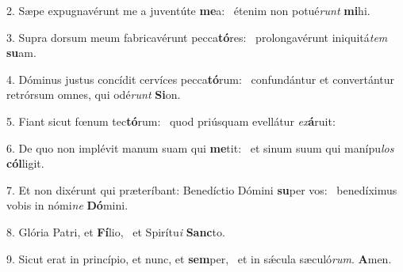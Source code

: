 2. Sæpe expugnavérunt me a juventúte \textbf{me}a: \ast\  étenim non potué\textit{runt} \textbf{mi}hi.\

3. Supra dorsum meum fabricavérunt pecca\textbf{tó}res: \ast\  prolongavérunt iniquitá\textit{tem} \textbf{su}am.\

4. Dóminus justus concídit cervíces pecca\textbf{tó}rum: \ast\  confundántur et convertántur retrórsum omnes, qui odé\textit{runt} \textbf{Si}on.\

5. Fiant sicut fœnum tec\textbf{tó}rum: \ast\  quod priúsquam evellátur \textit{ex}\textbf{á}ruit:\

6. De quo non implévit manum suam qui \textbf{me}tit: \ast\  et sinum suum qui manípu\textit{los} \textbf{cól}ligit.\

7. Et non dixérunt qui præteríbant: Benedíctio Dómini \textbf{su}per vos: \ast\  benedíximus vobis in nómi\textit{ne} \textbf{Dó}mini.\

8. Glória Patri, et \textbf{Fí}lio, \ast\  et Spirítu\textit{i} \textbf{Sanc}to.\

9. Sicut erat in princípio, et nunc, et \textbf{sem}per, \ast\  et in sǽcula sæculó\textit{rum}. \textbf{A}men.\


